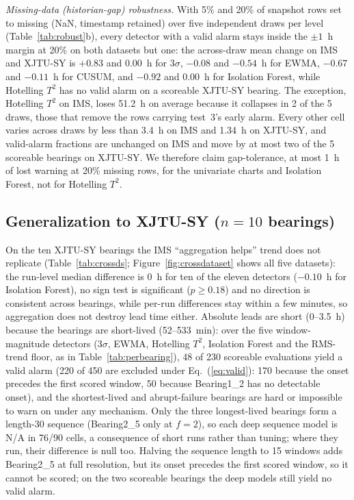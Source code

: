 \documentclass[IJPHM, 2026, 0]{PHMSociety}
\begin{document}
\emph{Missing-data (historian-gap) robustness.} With 5\% and 20\% of snapshot rows set to missing (NaN, timestamp retained) over five independent draws per level (Table~\ref{tab:robust}b), every detector with a valid alarm stays inside the $\pm 1$~h margin at 20\% on both datasets but one: the across-draw mean change on IMS and XJTU-SY is $+0.83$ and $0.00$~h for $3\sigma$, $-0.08$ and $-0.54$~h for EWMA, $-0.67$ and $-0.11$~h for CUSUM, and $-0.92$ and $0.00$~h for Isolation Forest, while Hotelling $T^2$ has no valid alarm on a scoreable XJTU-SY bearing. The exception, Hotelling $T^2$ on IMS, loses 51.2~h on average because it collapses in 2 of the 5 draws, those that remove the rows carrying test~3's early alarm. Every other cell varies across draws by less than 3.4~h on IMS and 1.34~h on XJTU-SY, and valid-alarm fractions are unchanged on IMS and move by at most two of the 5 scoreable bearings on XJTU-SY. We therefore claim gap-tolerance, at most 1~h of lost warning at 20\% missing rows, for the univariate charts and Isolation Forest, not for Hotelling $T^2$.

\subsection{Generalization to XJTU-SY ($n=10$ bearings)}
On the ten XJTU-SY bearings the IMS ``aggregation helps'' trend does not replicate (Table~\ref{tab:crossds}; Figure~\ref{fig:crossdataset} shows all five datasets): the run-level median difference is 0~h for ten of the eleven detectors ($-0.10$~h for Isolation Forest), no sign test is significant ($p \ge 0.18$) and no direction is consistent across bearings, while per-run differences stay within a few minutes, so aggregation does not destroy lead time either. Absolute leads are short (0--3.5~h) because the bearings are short-lived (52--533~min): over the five window-magnitude detectors ($3\sigma$, EWMA, Hotelling $T^2$, Isolation Forest and the RMS-trend floor, as in Table~\ref{tab:perbearing}), 48 of 230 scoreable evaluations yield a valid alarm (220 of 450 are excluded under Eq.~(\ref{eq:valid}): 170 because the onset precedes the first scored window, 50 because Bearing1\_2 has no detectable onset), and the shortest-lived and abrupt-failure bearings are hard or impossible to warn on under any mechanism. Only the three longest-lived bearings form a length-30 sequence (Bearing2\_5 only at $f=2$), so each deep sequence model is N/A in 76/90 cells, a consequence of short runs rather than tuning; where they run, their difference is null too. Halving the sequence length to 15 windows adds Bearing2\_5 at full resolution, but its onset precedes the first scored window, so it cannot be scored; on the two scoreable bearings the deep models still yield no valid alarm.
\end{document}
